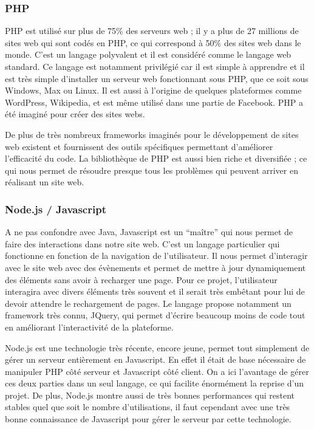         \subsubsection{PHP}
        \label{subsubsec:php}
        PHP est utilisé sur plus de 75\% des serveurs web ; il y a plus de 27 millions de sites web qui
        sont codés en PHP, ce qui correspond à 50\% des sites web dans le monde. C’est un langage
        polyvalent et il est considéré comme le langage web standard. Ce langage est notamment privilégié
        car il est simple à apprendre et il est très simple d’installer un serveur web fonctionnant sous PHP,
        que ce soit sous Windows, Max ou Linux. Il est aussi à l’origine de quelques plateformes comme
        WordPress, Wikipedia, et est même utilisé dans une partie de Facebook. PHP a été imaginé pour
        créer des sites webs. 

        De plus de très nombreux frameworks imaginés pour le développement de sites web existent
        et fournissent des outils spécifiques permettant d’améliorer l’efficacité du code. La bibliothèque de
        PHP est aussi bien riche et diversifiée ; ce qui nous permet de résoudre presque tous les problèmes
        qui peuvent arriver en réalisant un site web.

        \subsubsection{Node.js / Javascript}
        \label{subsubsec:node}
        A ne pas confondre avec Java, Javascript est un “maître” qui nous permet de faire des
        interactions dans notre site web. C’est un langage particulier qui fonctionne en fonction de la
        navigation de l’utilisateur. Il nous permet d’interagir avec le site web avec des évènements et permet
        de mettre à jour dynamiquement des éléments sans avoir à recharger une page. Pour ce projet,
        l’utilisateur interagira avec divers éléments très souvent et il serait très embêtant pour lui de devoir
        attendre le rechargement de pages. Le langage propose notamment un framework très connu,
        JQuery, qui permet d’écrire beaucoup moins de code tout en améliorant l’interactivité de la
        plateforme.

        Node.js est une technologie très récente, encore jeune, permet tout simplement de gérer un
        serveur entièrement en Javascript. En effet il était de base nécessaire de manipuler PHP côté serveur
        et Javascript côté client. On a ici l’avantage de gérer ces deux parties dans un seul langage, ce qui
        facilite énormément la reprise d’un projet. De plus, Node.js montre aussi de très bonnes
        performances qui restent stables quel que soit le nombre d’utilisations, il faut cependant avec une
        très bonne connaissance de Javascript pour gérer le serveur par cette technologie.

